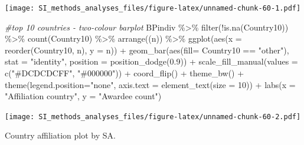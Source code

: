 \documentclass[
]{article}
\newenvironment{Shaded}{\begin{snugshade}}{\end{snugshade}}
\newcommand{\AttributeTok}[1]{\textcolor[rgb]{0.77,0.63,0.00}{#1}}
\newcommand{\CommentTok}[1]{\textcolor[rgb]{0.56,0.35,0.01}{\textit{#1}}}
\newcommand{\DecValTok}[1]{\textcolor[rgb]{0.00,0.00,0.81}{#1}}
\newcommand{\FloatTok}[1]{\textcolor[rgb]{0.00,0.00,0.81}{#1}}
\newcommand{\FunctionTok}[1]{\textcolor[rgb]{0.00,0.00,0.00}{#1}}
\newcommand{\NormalTok}[1]{#1}
\newcommand{\SpecialCharTok}[1]{\textcolor[rgb]{0.00,0.00,0.00}{#1}}
\newcommand{\StringTok}[1]{\textcolor[rgb]{0.31,0.60,0.02}{#1}}
\begin{document}
\texttt{[image: SI\_methods\_analyses\_files/figure-latex/unnamed-chunk-60-1.pdf]}

\begin{Shaded}
\begin{Highlighting}[]
\CommentTok{\#top 10 countries {-} two{-}colour barplot}
\NormalTok{BPindiv }\SpecialCharTok{\%\textgreater{}\%} 
  \FunctionTok{filter}\NormalTok{(}\SpecialCharTok{!}\FunctionTok{is.na}\NormalTok{(Country10)) }\SpecialCharTok{\%\textgreater{}\%} 
  \FunctionTok{count}\NormalTok{(Country10) }\SpecialCharTok{\%\textgreater{}\%}
  \FunctionTok{arrange}\NormalTok{((n)) }\SpecialCharTok{\%\textgreater{}\%}
  \FunctionTok{ggplot}\NormalTok{(}\FunctionTok{aes}\NormalTok{(}\AttributeTok{x =} \FunctionTok{reorder}\NormalTok{(Country10, n), }\AttributeTok{y =}\NormalTok{ n)) }\SpecialCharTok{+}
  \FunctionTok{geom\_bar}\NormalTok{(}\FunctionTok{aes}\NormalTok{(}\AttributeTok{fill=}\NormalTok{ Country10 }\SpecialCharTok{==} \StringTok{"other"}\NormalTok{), }\AttributeTok{stat =} \StringTok{"identity"}\NormalTok{, }\AttributeTok{position =} \FunctionTok{position\_dodge}\NormalTok{(}\FloatTok{0.9}\NormalTok{)) }\SpecialCharTok{+}
  \FunctionTok{scale\_fill\_manual}\NormalTok{(}\AttributeTok{values =} \FunctionTok{c}\NormalTok{(}\StringTok{"\#DCDCDCFF"}\NormalTok{, }\StringTok{"\#000000"}\NormalTok{)) }\SpecialCharTok{+}
  \FunctionTok{coord\_flip}\NormalTok{() }\SpecialCharTok{+} 
  \FunctionTok{theme\_bw}\NormalTok{() }\SpecialCharTok{+}
  \FunctionTok{theme}\NormalTok{(}\AttributeTok{legend.position=}\StringTok{"none"}\NormalTok{, }\AttributeTok{axis.text =} \FunctionTok{element\_text}\NormalTok{(}\AttributeTok{size =} \DecValTok{10}\NormalTok{)) }\SpecialCharTok{+}
  \FunctionTok{labs}\NormalTok{(}\AttributeTok{x =} \StringTok{"Affiliation country"}\NormalTok{, }\AttributeTok{y =} \StringTok{"Awardee count"}\NormalTok{)  }
\end{Highlighting}
\end{Shaded}

\texttt{[image: SI\_methods\_analyses\_files/figure-latex/unnamed-chunk-60-2.pdf]}

Country affiliation plot by SA.
\end{document}

